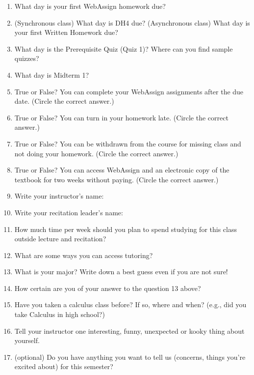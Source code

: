 \documentclass[12pt]{article}
\begin{document}
\begin{enumerate} 
\item What day is your first WebAssign homework due?
\vfill
\item (Synchronous class) What day is DH4 due? (Asynchronous class) What day is your first Written Homework due?
\vfill
\item What day is the Prerequisite Quiz (Quiz 1)? Where can you find sample quizzes?
\vfill 
\item What day is Midterm 1? 
\vfill 
\item True or False? You can complete your WebAssign assignments after the due date. (Circle the correct answer.)
\vfill
\item  True or False? You can turn in your homework late. (Circle the correct answer.)
\vfill
\item  True or False? You can be withdrawn from the course for missing class and not doing your homework. (Circle the correct answer.)
\vfill
\item  True or False? You can access WebAssign and an electronic copy of the textbook for two weeks without paying. (Circle the correct answer.)
\vfill
\item Write your instructor's name: 
\vfill
\item Write your recitation leader's name: 
\vfill

\newpage

\item How much time per week should you plan to spend studying for this class outside lecture and recitation?
\vfill

\item What are some ways you can access tutoring?
\vfill
\item What is your major? Write down a best guess even if you are not sure!
\vfill
\item How certain are you of your answer to the question 13 above? 
\vfill

\item Have you taken a calculus class before? If so, where and when? (e.g., did you take Calculus in high school?)
\vfill
\item Tell your instructor one interesting, funny, unexpected or kooky thing about yourself.
\vfill
\item (optional) Do you have anything you want to tell us (concerns, things you're excited about) for this semester? 
\vspace{2in}
\end{enumerate}
\end{document}

